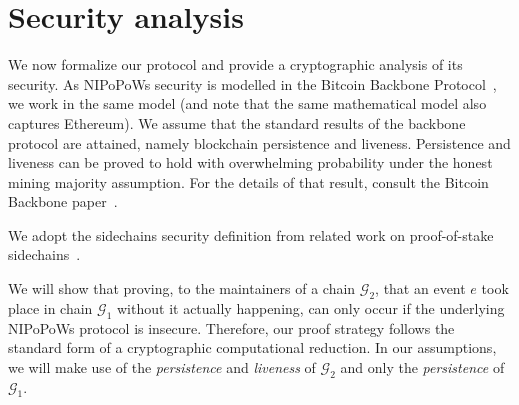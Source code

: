 \section{Security analysis}

We now formalize our protocol and provide a cryptographic analysis of its
security. As NIPoPoWs security is modelled in the Bitcoin
Backbone Protocol~\cite{backbone}, we work in the same model (and note that the
same mathematical model also captures Ethereum). We assume that the standard
results of the backbone protocol are attained, namely blockchain persistence and
liveness. Persistence and liveness can be proved to hold with overwhelming
probability under the honest mining majority assumption. For the details of that
result, consult the Bitcoin Backbone paper~\cite{backbone}.

We adopt the sidechains security definition from related work on proof-of-stake
sidechains~\cite{sidechain-pos}.

We will show that proving, to the maintainers of a chain $\mathcal{G}_2$, that
an event $e$ took place in chain $\mathcal{G}_1$ without it actually happening,
can only occur if the underlying NIPoPoWs protocol is insecure. Therefore, our
proof strategy follows the standard form of a cryptographic computational
reduction. In our assumptions, we will make use of the \emph{persistence} and
\emph{liveness} of $\mathcal{G}_2$ and only the \emph{persistence} of
$\mathcal{G}_1$.


